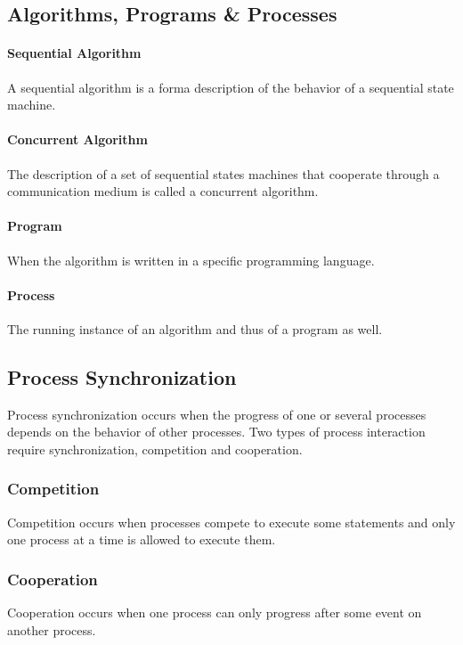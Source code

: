 \subsection{Algorithms, Programs \& Processes}

\paragraph{Sequential Algorithm}
A sequential algorithm is a forma description of the behavior of a sequential state machine.

\paragraph{Concurrent Algorithm}
The description of a set of sequential states machines that cooperate through a communication medium is called a concurrent algorithm.

\paragraph{Program}
When the algorithm is written in a specific programming language.

\paragraph{Process}
The running instance of an algorithm and thus of a program as well.

\subsection{Process Synchronization}
Process synchronization occurs when the progress of one or several processes depends on the behavior of other processes.
Two types of process interaction require synchronization, competition and cooperation.

\subsubsection{Competition}
Competition occurs when processes compete to execute some statements and only one process at a time is allowed to execute them.

\subsubsection{Cooperation}
Cooperation occurs when one process can only progress after some event on another process.

